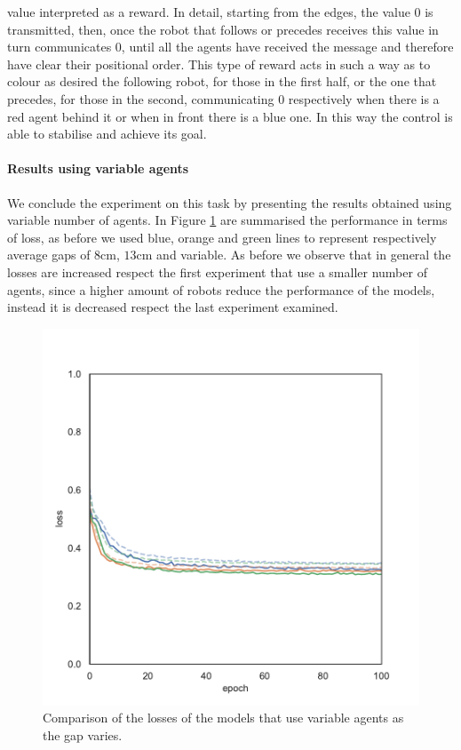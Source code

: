 value interpreted as a reward. In detail, starting from the edges, the value 0 is 
transmitted, then, once the robot that follows or precedes receives this value in 
turn communicates 0, until all the agents have received the message and 
therefore have clear their positional order.
This type of reward acts in such a way as to colour as desired the following robot, 
for those in the first half, or the one that precedes, for those in the second, 
communicating 0 respectively when there is a red agent behind it or when in front 
there is a blue one. In this way the control is able to stabilise and achieve its goal.


\paragraph*{Results using variable agents}
We conclude the experiment on this task by presenting the results obtained using 
variable number of agents. In Figure \ref{fig:commlossnvart2} are summarised the 
performance in terms of loss, as before we used blue, orange and green lines to 
represent respectively average gaps of $8$\gls{cm}, $13$\gls{cm} and variable. 
As before we observe that in general the losses are increased respect the first 
experiment that use a smaller number of agents, since a higher amount of robots 
reduce the performance of the models, instead it is decreased respect the last 
experiment examined.
\begin{figure}[!htb]
	\centering
	\includegraphics[width=.47\textwidth]{contents/images/task2/loss-communication-Nvar}
	\caption{Comparison of the losses of the models that use variable agents as the 
		gap varies.}
	\label{fig:commlossnvart2}
\end{figure}

